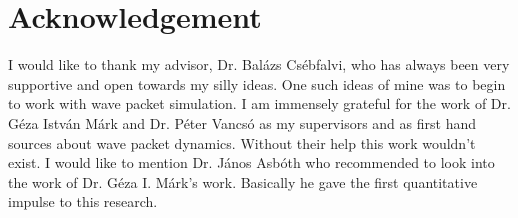 \section{Acknowledgement}

I would like to thank my advisor, Dr. Balázs Csébfalvi, who has always been very supportive and open towards my silly ideas. One such ideas of mine was to begin to work with wave packet simulation.
I am immensely grateful for the work of Dr. Géza István Márk and Dr. Péter Vancsó as my supervisors and as first hand sources about wave packet dynamics.
Without their help this work wouldn't exist.
I would like to mention Dr. János Asbóth who recommended to look into the work of Dr. Géza I. Márk's work.
Basically he gave the first quantitative impulse to this research.



